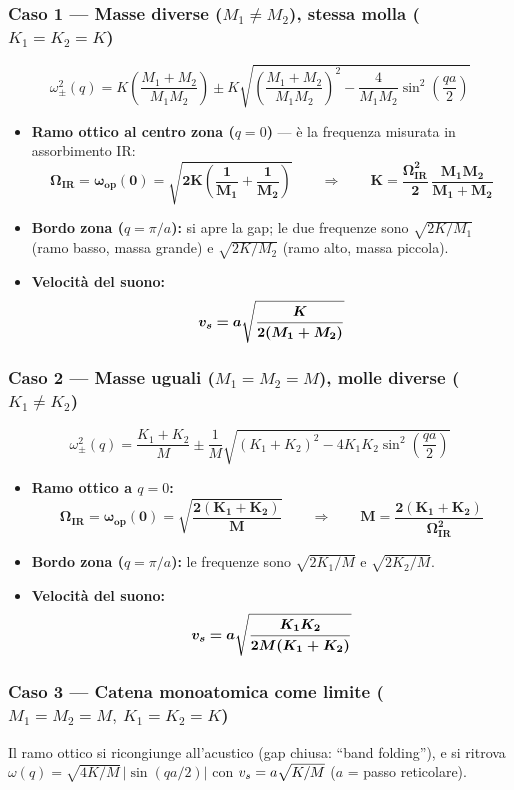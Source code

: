 \subsubsection*{Caso 1 --- Masse diverse ($M_1\neq M_2$), stessa molla ($K_1=K_2=K$)}
\[ \omega^2_{\pm}(q) = K\left(\frac{M_1+M_2}{M_1 M_2}\right) \pm K \sqrt{\left(\frac{M_1+M_2}{M_1 M_2}\right)^2 - \frac{4}{M_1 M_2}\sin^2\!\left(\frac{qa}{2}\right)} \]
\begin{itemize}
  \item \textbf{Ramo ottico al centro zona ($q=0$)} --- è la frequenza misurata in assorbimento IR:
  \[ \bm{\Omega_{IR} = \omega_{op}(0) = \sqrt{2K\left(\frac{1}{M_1}+\frac{1}{M_2}\right)}}
     \qquad\Longrightarrow\qquad \bm{K = \frac{\Omega_{IR}^2}{2}\,\frac{M_1M_2}{M_1+M_2}} \]
  \item \textbf{Bordo zona ($q=\pi/a$):} si apre la gap; le due frequenze sono $\sqrt{2K/M_1}$ (ramo basso, massa grande) e $\sqrt{2K/M_2}$ (ramo alto, massa piccola).
  \item \textbf{Velocità del suono:}
  \[ \bm{v_s = a\sqrt{\frac{K}{2(M_1+M_2)}}} \]
\end{itemize}


\subsubsection*{Caso 2 --- Masse uguali ($M_1=M_2=M$), molle diverse ($K_1\neq K_2$)}
\[ \omega^2_{\pm}(q) = \frac{K_1+K_2}{M} \pm \frac{1}{M}\sqrt{(K_1+K_2)^2 - 4K_1 K_2 \sin^2\!\left(\frac{qa}{2}\right)} \]
\begin{itemize}
  \item \textbf{Ramo ottico a $q=0$:}
  \[ \bm{\Omega_{IR}=\omega_{op}(0) = \sqrt{\frac{2(K_1+K_2)}{M}}} \qquad\Longrightarrow\qquad \bm{M = \frac{2(K_1+K_2)}{\Omega_{IR}^2}} \]
  \item \textbf{Bordo zona ($q=\pi/a$):} le frequenze sono $\sqrt{2K_1/M}$ e $\sqrt{2K_2/M}$.
  \item \textbf{Velocità del suono:}
  \[ \bm{v_s = a\sqrt{\frac{K_1K_2}{2M(K_1+K_2)}}} \]
\end{itemize}

\subsubsection*{Caso 3 --- Catena monoatomica come limite ($M_1=M_2=M,\ K_1=K_2=K$)}
Il ramo ottico si ricongiunge all'acustico (gap chiusa: ``band folding''), e si ritrova
$\omega(q) = \sqrt{4K/M}\,|\sin(qa/2)|$ con $v_s=a\sqrt{K/M}$ ($a$ = passo reticolare).



